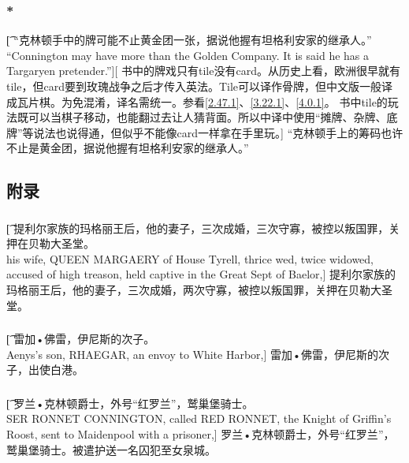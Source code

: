 \documentclass[12pt,a4paper]{article}
\begin{document}
\subsubsection{\color{red}*}\label{5.72.1}\t[	
	“克林顿手中的牌可能不止黄金团一张，据说他握有坦格利安家的继承人。”\\
	“Connington may have more than the Golden Company. It is said he has a Targaryen pretender.”][
	书中的牌戏只有tile没有card。从历史上看，欧洲很早就有tile，但card要到玫瑰战争之后才传入英法。Tile可以译作骨牌，但中文版一般译成瓦片棋。为免混淆，译名需统一。参看\ref{2.47.1}、\ref{3.22.1}、\ref{4.0.1}。
	书中tile的玩法既可以当棋子移动，也能翻过去让人猜背面。所以中译中使用“摊牌、杂牌、底牌”等说法也说得通，但似乎不能像card一样拿在手里玩。]
	“克林顿手上的筹码也许不止是黄金团，据说他握有坦格利安家的继承人。”

\subsection{附录}
\subsubsection{}\t[
提利尔家族的{\large 玛格丽王后}，他的妻子，三次成婚，三次守寡，被控以叛国罪，关押在贝勒大圣堂。 \\
his wife, QUEEN MARGAERY of House Tyrell, thrice wed, twice widowed, accused of high treason, held captive in the Great Sept of Baelor,]
提利尔家族的{\large 玛格丽王后}，他的妻子，三次成婚，两次守寡，被控以叛国罪，关押在贝勒大圣堂。 

\subsubsection{}\t[
	{\large 雷加•佛雷}，伊尼斯的次子。\\
	Aenys's son, RHAEGAR, an envoy to White Harbor,]
	{\large 雷加•佛雷}，伊尼斯的次子，出使白港。
\subsubsection{}\t[
	{\large 罗兰•克林顿爵士}，外号“红罗兰”，鹫巢堡骑士。\\
	SER RONNET CONNINGTON, called RED RONNET, the Knight of Griffin's Roost, sent to Maidenpool with a prisoner,]
	{\large 罗兰•克林顿爵士}，外号“{\large 红罗兰}”，鹫巢堡骑士。被遣护送一名囚犯至女泉城。
\end{document}
